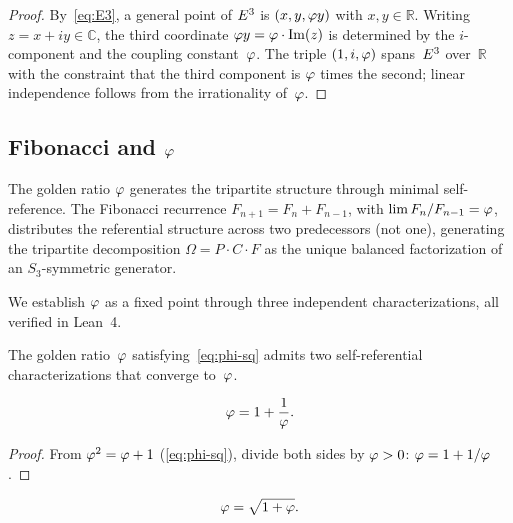 \begin{proof}
By~\cref{eq:E3}, a general point of $E^3$ is $(x,y,\varphi y)$ with
$x,y\in\mathbb{R}$.  Writing $z = x + iy\in\mathbb{C}$, the third
coordinate $\varphi y = \varphi\cdot\mathrm{Im}(z)$ is determined by the
$i$-component and the coupling constant~$\varphi$.  The triple
$(1,i,\varphi)$ spans~$E^3$ over~$\mathbb{R}$ with the constraint that
the third component is $\varphi$ times the second; linear independence
follows from the irrationality of~$\varphi$.
\end{proof}


\subsection{Fibonacci and \texorpdfstring{$\varphi$}{phi}}\label{ssec:fibonacci}

The golden ratio $\varphi$ generates the tripartite structure through
minimal self-reference.  The Fibonacci recurrence
$F_{n+1}=F_n+F_{n-1}$, with
$\lim F_n/F_{n-1}=\varphi$, distributes the referential structure across
two predecessors (not one), generating the tripartite decomposition
$\Omega=P\cdot C\cdot F$ as the unique balanced factorization of an
$S_3$-symmetric generator.

We establish $\varphi$ as a fixed point through three independent
characterizations, all verified in Lean~4.

The golden ratio~$\varphi$ satisfying~\cref{eq:phi-sq} admits two
self-referential characterizations that converge to~$\varphi$.

\begin{Lemma}\label{lem:phi-cf}
\begin{equation}\label{eq:phi-continued-frac}
  \varphi = 1 + \frac{1}{\varphi}.
\end{equation}
\end{Lemma}

\begin{proof}
From $\varphi^2 = \varphi + 1$ (\cref{eq:phi-sq}), divide both
sides by $\varphi > 0$: $\varphi = 1 + 1/\varphi$.
\end{proof}

\begin{Lemma}\label{lem:phi-nr}
\begin{equation}\label{eq:phi-nested-radical}
  \varphi = \sqrt{1+\varphi}.
\end{equation}
\end{Lemma}

